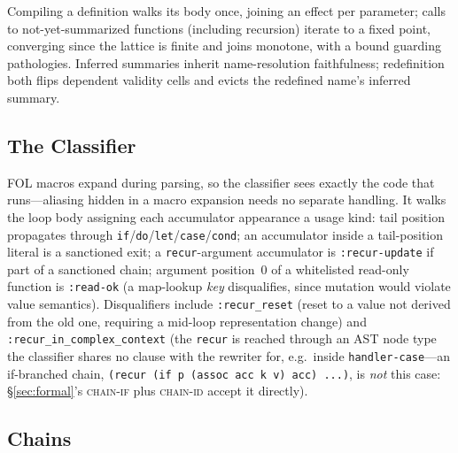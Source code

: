 \documentclass[sigplan,review,anonymous]{acmart}
\begin{document}
Compiling a definition walks its body once, joining an effect per parameter; calls to not-yet-summarized functions (including recursion) iterate to a fixed point, converging since the lattice is finite and joins monotone, with a bound guarding pathologies. Inferred summaries inherit name-resolution faithfulness; redefinition both flips dependent validity cells and evicts the redefined name's inferred summary.

\subsection{The Classifier}

FOL macros expand during parsing, so the classifier sees exactly the code that runs---aliasing hidden in a macro expansion needs no separate handling. It walks the loop body assigning each accumulator appearance a usage kind: tail position propagates through \texttt{if}/\texttt{do}/\texttt{let}/\texttt{case}/\texttt{cond}; an accumulator inside a tail-position literal is a sanctioned exit; a \texttt{recur}-argument accumulator is \texttt{:recur-update} if part of a sanctioned chain; argument position~0 of a whitelisted read-only function is \texttt{:read-ok} (a map-lookup \emph{key} disqualifies, since mutation would violate value semantics). Disqualifiers include \texttt{:recur\_reset} (reset to a value not derived from the old one, requiring a mid-loop representation change) and \texttt{:recur\_in\_complex\_context} (the \texttt{recur} is reached through an AST node type the classifier shares no clause with the rewriter for, e.g.\ inside \texttt{handler-case}---an if-branched chain, \texttt{(recur (if p (assoc acc k v) acc) ...)}, is \emph{not} this case: §\ref{sec:formal}'s \textsc{chain-if} plus \textsc{chain-id} accept it directly).

\subsection{Chains}
\label{sec:chains}
\end{document}
